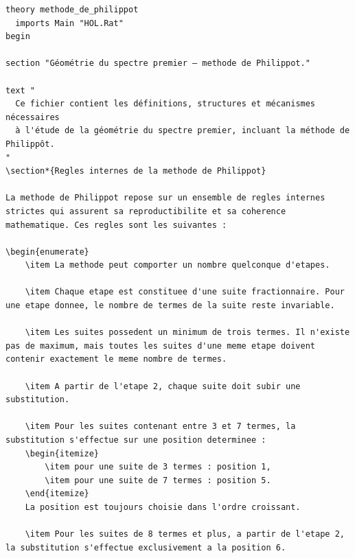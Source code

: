 \documentclass[a4paper,11pt]{article}
\begin{document}
\begin{holcode}[title={\textcolor{white}{Fichier : methode\_de\_philippot.thy -- COMPLET}}]
\begin{lstlisting}
theory methode_de_philippot
  imports Main "HOL.Rat"
begin

section "Géométrie du spectre premier – methode de Philippot."

text "
  Ce fichier contient les définitions, structures et mécanismes nécessaires
  à l'étude de la géométrie du spectre premier, incluant la méthode de Philippôt.
"
\section*{Regles internes de la methode de Philippot}

La methode de Philippot repose sur un ensemble de regles internes strictes qui assurent sa reproductibilite et sa coherence mathematique. Ces regles sont les suivantes :

\begin{enumerate}
    \item La methode peut comporter un nombre quelconque d'etapes.
    
    \item Chaque etape est constituee d'une suite fractionnaire. Pour une etape donnee, le nombre de termes de la suite reste invariable.
    
    \item Les suites possedent un minimum de trois termes. Il n'existe pas de maximum, mais toutes les suites d'une meme etape doivent contenir exactement le meme nombre de termes.
    
    \item A partir de l'etape 2, chaque suite doit subir une substitution.
    
    \item Pour les suites contenant entre 3 et 7 termes, la substitution s'effectue sur une position determinee :  
    \begin{itemize}
        \item pour une suite de 3 termes : position 1,  
        \item pour une suite de 7 termes : position 5.  
    \end{itemize}
    La position est toujours choisie dans l'ordre croissant.
    
    \item Pour les suites de 8 termes et plus, a partir de l'etape 2, la substitution s'effectue exclusivement a la position 6.
    

\end{lstlisting}
\end{holcode}
\end{document}
